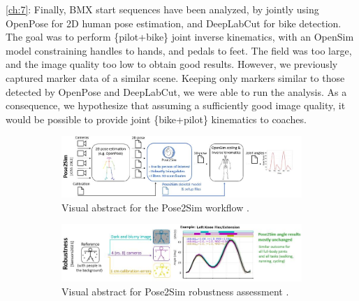 \vspace*{0.2cm}
\noindent\autoref{ch:7}: Finally, BMX start sequences have been analyzed, by jointly using OpenPose for 2D human pose estimation, and DeepLabCut for bike detection. The goal was to perform \{pilot+bike\} joint inverse kinematics, with an OpenSim model constraining handles to hands, and pedals to feet. The field was too large, and the image quality too low to obtain good results. However, we previously captured marker data of a similar scene. Keeping only markers similar to those detected by OpenPose and DeepLabCut, we were able to run the analysis. As a consequence, we hypothesize that assuming a sufficiently good image quality, it would be possible to provide joint \{bike+pilot\} kinematics to coaches. 


\begin{figure}[hbtp]
	\centering
	\begin{subfigure}[b]{1\textwidth}
            \centering
            \def\svgwidth{1\columnwidth}
            \fontsize{10pt}{10pt}\selectfont
            \includegraphics[width=\linewidth]{"../Intro/Figures/Fig_VisAbstract1.JPG"}
            \caption{Visual abstract for the Pose2Sim workflow \cite{Pagnon2022b}.}
            \label{fig_visabstract1_1}
	\end{subfigure}
	\vskip 1cm
	\begin{subfigure}[b]{1\textwidth}
            \centering
            \def\svgwidth{1\columnwidth}
            \fontsize{10pt}{10pt}\selectfont
            \includegraphics[width=\linewidth]{"../Intro/Figures/Fig_VisAbstract2.JPG"}
            \caption{Visual abstract for Pose2Sim robustness assessment \cite{Pagnon2021}.}
            \label{fig_visabstract2_1}
	\end{subfigure}
	\vskip 1cm
      \begin{subfigure}[b]{1\textwidth}

\end{subfigure}
\end{figure}
